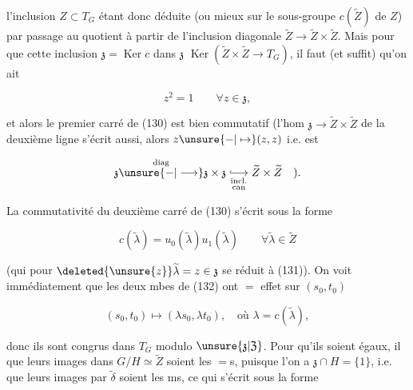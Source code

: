 
 

l'inclusion $Z\subset T_G$ étant donc déduite (ou mieux sur le sous-groupe $c(\widetilde Z)$ de $Z$) par passage au quotient à partir de l'inclusion diagonale $\widetilde Z\longrightarrow\widetilde Z\times\widetilde Z$. Mais pour que cette inclusion   $\mathfrak{z}=\operatorname{Ker} c$ dans $\mathfrak{z}$  $\operatorname{Ker}(\widetilde Z\times\widetilde Z\longrightarrow T_G)$, il faut (et suffit) qu'on ait

\[z^2=1\qquad\forall z\in\mathfrak{z},\tag*{(131)}\]

et alors le premier carré de (130) est bien commutatif (l'hom $\mathfrak{z}\longrightarrow\widetilde Z\times\widetilde Z$ de la deuxième ligne  s'écrit aussi, alors $z\unsure{-|\mapsto}(z,z)$ i.e. est  

\[\mathfrak{z}\overset{\mathrm{diag}}{\unsure{-|\longrightarrow}}\mathfrak{z}\times\mathfrak{z}
\underset{\substack{\mathrm{incl}.\\\mathrm{can}}}{\lhook\joinrel\longrightarrow}
\widetilde Z\times\widetilde Z\quad).\]

La commutativité du deuxième carré de (130) s'écrit sous la forme

\[c(\widetilde\lambda)=u_0(\widetilde\lambda)u_1(\widetilde\lambda)\qquad\forall\widetilde\lambda\in\widetilde Z\tag*{(132)}\]

(qui  pour $\deleted{\unsure{z}}\widetilde\lambda=z\in\mathfrak{z}$ se réduit à (131)). On voit immédiatement que les deux mbes de (132)  ont $=$ effet sur $(s_0,t_0)$

\[(s_0,t_0)\longmapsto(\lambda s_0,\lambda t_0),\quad\text{où }\lambda=c(\widetilde\lambda),\]



donc ils sont congrus dans $T_G$ modulo $\unsure{\mathfrak{z}|\mathfrak{Z}}$. Pour  qu'ils soient égaux, il   que leurs images dans $G/H\simeq\widetilde Z$ soient les $=$s, puisque l'on a $\mathfrak{z}\cap H=\{1\}$, i.e. que leurs images par $\widetilde\delta$ soient les ms, ce qui s'écrit sous la forme

